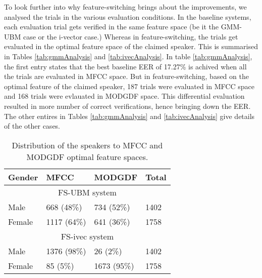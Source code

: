 \documentclass{article}
\begin{document}
To look further into why feature-switching brings about the improvements, we
analysed the trials in the various evaluation conditions. In the baseline
systems, each evaluation trial gets verified in the same feature space (be it
the GMM-UBM case or the i-vector case.) Whereas in feature-switching, the trials
get evaluated in the optimal feature space of the claimed speaker. This is
summarised in Tables \ref{tab:gmmAnalysis} and \ref{tab:ivecAnalysis}.  In table
\ref{tab:gmmAnalysis}, the first entry states that the best baseline EER of
17.27\% is achived when all the trials are evaluated in MFCC space. But in
feature-switching, based on the optimal feature of the claimed speaker, 187
trials were evaluated in MFCC space and 168 trials were evlauated in MODGDF
space. This differential evaluation resulted in more number of correct
verifications, hence bringing down the EER. The other entires in Tables
\ref{tab:gmmAnalysis} and \ref{tab:ivecAnalysis} give details of the other
cases. 

\begin{table}[h]
\centering
\begin{tabular}{|l|l|l|l|}
\hline
Gender & MFCC & MODGDF & Total \\
\hline
\multicolumn{4}{|c|}{FS-UBM system}\\
\hline
Male & 668 (48\%) & 734 (52\%) & 1402 \\
Female & 1117 (64\%) & 641 (36\%) & 1758 \\
\hline
\multicolumn{4}{|c|}{FS-ivec system}\\
\hline
Male & 1376 (98\%)& 26 (2\%)& 1402 \\
Female & 85 (5\%) & 1673 (95\%) & 1758 \\
\hline
\end{tabular}
\caption{Distribution of the speakers to MFCC and MODGDF optimal feature spaces.}
\label{tab:optFeat}
\end{table}

\end{document}
